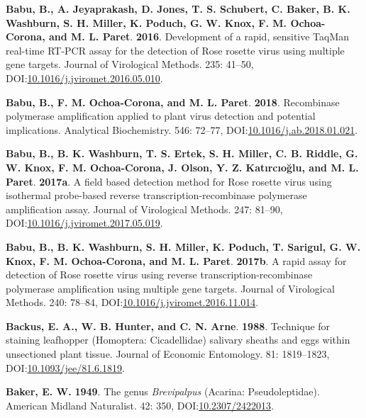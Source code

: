 \documentclass[12pt,final,CPage]{ufthesis}
\newlength{\cslhangindent}
\newenvironment{CSLReferences}[2] %
{%
	\setlength{\parindent}{0pt}
	\ifodd #1 \everypar{\setlength{\hangindent}{\cslhangindent}}\ignorespaces\fi
	\ifnum #2 > 0
	\setlength{\parskip}{#2\baselineskip}
	\fi
}%
{}
\begin{document}
{\begin{CSLReferences}{1}{0}
  \leavevmode{}%
  \textbf{Babu, B., A. Jeyaprakash, D. Jones, T. S. Schubert, C. Baker, B. K. Washburn, S. H. Miller, K. Poduch, G. W. Knox, F. M. Ochoa-Corona, and M. L. Paret}. \textbf{2016}. Development of a rapid, sensitive {TaqMan} real-time {RT}-{PCR} assay for the detection of {Rose rosette virus} using multiple gene targets. Journal of Virological Methods. 235: 41--50, DOI:\href{https://doi.org/10.1016/j.jviromet.2016.05.010}{10.1016/j.jviromet.2016.05.010}.

  \leavevmode{}%
  \textbf{Babu, B., F. M. Ochoa-Corona, and M. L. Paret}. \textbf{2018}. Recombinase polymerase amplification applied to plant virus detection and potential implications. Analytical Biochemistry. 546: 72--77, DOI:\href{https://doi.org/10.1016/j.ab.2018.01.021}{10.1016/j.ab.2018.01.021}.

  \leavevmode{}%
  \textbf{Babu, B., B. K. Washburn, T. S. Ertek, S. H. Miller, C. B. Riddle, G. W. Knox, F. M. Ochoa-Corona, J. Olson, Y. Z. Katırcıoğlu, and M. L. Paret}. \textbf{2017a}. A field based detection method for {Rose rosette virus} using isothermal probe-based reverse transcription-recombinase polymerase amplification assay. Journal of Virological Methods. 247: 81--90, DOI:\href{https://doi.org/10.1016/j.jviromet.2017.05.019}{10.1016/j.jviromet.2017.05.019}.

  \leavevmode{}%
  \textbf{Babu, B., B. K. Washburn, S. H. Miller, K. Poduch, T. Sarigul, G. W. Knox, F. M. Ochoa-Corona, and M. L. Paret}. \textbf{2017b}. A rapid assay for detection of {Rose rosette virus} using reverse transcription-recombinase polymerase amplification using multiple gene targets. Journal of Virological Methods. 240: 78--84, DOI:\href{https://doi.org/10.1016/j.jviromet.2016.11.014}{10.1016/j.jviromet.2016.11.014}.

  \leavevmode{}%
  \textbf{Backus, E. A., W. B. Hunter, and C. N. Arne}. \textbf{1988}. Technique for staining leafhopper ({Homoptera}: {Cicadellidae}) salivary sheaths and eggs within unsectioned plant tissue. Journal of Economic Entomology. 81: 1819--1823, DOI:\href{https://doi.org/10.1093/jee/81.6.1819}{10.1093/jee/81.6.1819}.

  \leavevmode{}%
  \textbf{Baker, E. W.} \textbf{1949}. The genus {\emph{Brevipalpus}} ({Acarina}: {Pseudoleptidae}). American Midland Naturalist. 42: 350, DOI:\href{https://doi.org/10.2307/2422013}{10.2307/2422013}.


\end{CSLReferences}}
\end{document}
